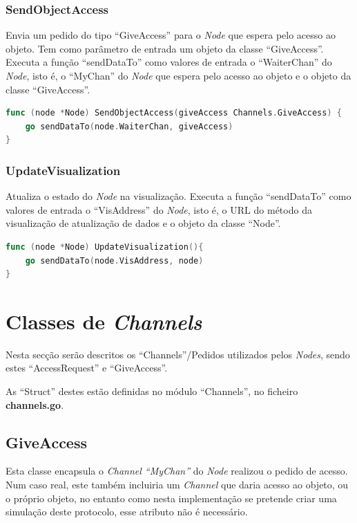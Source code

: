 \subsubsection*{SendObjectAccess}
Envia um pedido do tipo ``GiveAccess'' para o \emph{Node} que espera pelo acesso ao objeto.
Tem como parâmetro de entrada um objeto da classe ``GiveAccess''.
Executa a função ``sendDataTo'' como valores de entrada o ``WaiterChan'' do \emph{Node}, isto é, o ``MyChan'' do \emph{Node} que espera pelo acesso ao objeto
e o objeto da classe ``GiveAccess''.

\begin{lstlisting}[caption={Método ``SendObjectAccess''},language=Go]
func (node *Node) SendObjectAccess(giveAccess Channels.GiveAccess) {
	go sendDataTo(node.WaiterChan, giveAccess)
}

\end{lstlisting}

\subsubsection*{UpdateVisualization}
Atualiza o estado do \emph{Node} na visualização.
Executa a função ``sendDataTo'' como valores de entrada o ``VisAddress'' do \emph{Node}, isto é, o \acs{URL} do método da visualização de atualização de dados
e o objeto da classe ``Node''.

\begin{lstlisting}[caption={Método ``UpdateVisualization''},language=Go]
func (node *Node) UpdateVisualization(){
	go sendDataTo(node.VisAddress, node)
}
\end{lstlisting}


\section{Classes de \emph{Channels}}
\label{implementacao:sec:class_channels}
Nesta secção serão descritos os ``Channels''/Pedidos utilizados pelos \emph{Nodes}, sendo estes ``AccessRequest'' e ``GiveAccess''.

As ``Struct'' destes estão definidas no módulo ``Channels'', no ficheiro \textbf{channels.go}.


\subsection*{GiveAccess}
Esta classe encapsula o \emph{Channel ``MyChan''} do \emph{Node} realizou o pedido de acesso.
Num caso real, este também incluiria um \emph{Channel} que daria acesso ao objeto, ou o próprio objeto, no entanto
como nesta implementação se pretende criar uma simulação deste protocolo, esse atributo não é necessário.

